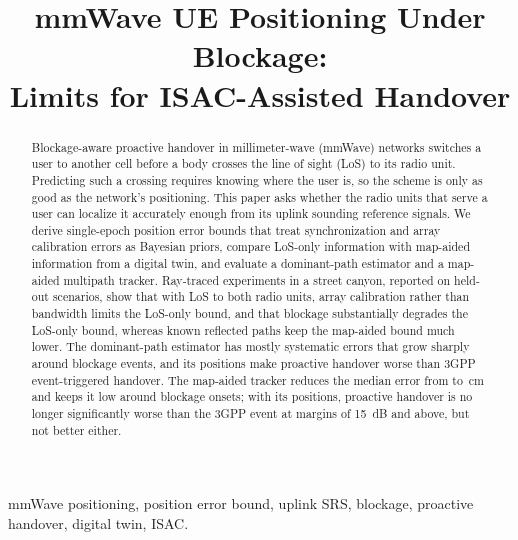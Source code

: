 \documentclass[conference]{IEEEtran}
\begin{document}

\title{mmWave UE Positioning Under Blockage:\\
Limits for ISAC-Assisted Handover}

\author{
}

\maketitle

\begin{abstract}
Blockage-aware proactive handover in millimeter-wave (mmWave) networks
switches a user to another cell before a body crosses the line of sight
(LoS) to its radio unit. Predicting such a crossing requires knowing
where the user is, so the scheme is only as good as the network's
positioning. This paper asks whether the radio units that serve a user
can localize it accurately enough from its uplink sounding reference
signals. We derive single-epoch position error bounds that treat
synchronization and array calibration errors as Bayesian priors,
compare LoS-only information with map-aided information from a digital
twin, and evaluate a dominant-path estimator and a map-aided multipath
tracker. Ray-traced experiments in a street canyon, reported on
held-out scenarios, show that with LoS to both radio units, array
calibration rather than bandwidth limits the LoS-only bound, and that
blockage substantially degrades the LoS-only bound,
whereas known reflected paths keep the map-aided bound much lower. The
dominant-path estimator has mostly systematic errors that grow sharply
around blockage events, and its positions make proactive handover worse
than 3GPP event-triggered handover. The map-aided tracker reduces the
median error from \pEstMedFourHundred{} to \pTrkMed\,cm and keeps it low
around blockage onsets; with its positions, proactive handover is no
longer significantly worse than the 3GPP event at margins of
\SI{15}{dB} and above, but not better either.
\end{abstract}

\begin{IEEEkeywords}
mmWave positioning, position error bound, uplink SRS, blockage,
proactive handover, digital twin, ISAC.
\end{IEEEkeywords}
\end{document}
